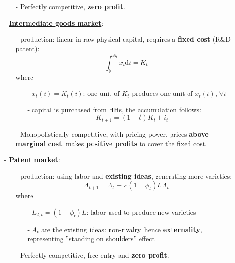 \documentclass[10pt,landscape,a4paper]{article}
\begin{document}
\begin{multicols*}{3}
\begin{itemize}
\begin{itemize}
        \item[-] Perfectly competitive, \textbf{zero profit}.
    \end{itemize}
    
    \item[-] \underline{\textbf{Intermediate goods market}}: 
    \begin{itemize}
        \item[-] production: linear in raw physical capital, requires a \textbf{fixed cost} (R\&D patent):
        $$
        \int^{A_t}_0 x_t \mathrm{d}i = K_t
        $$
        where
        \begin{itemize}
            \item[-] $x_t(i)=K_t(i)$: one unit of $K_t$ produces one unit of $x_t(i)$, \underline{$\forall i$}
            \item[-] capital is purchased from HHs, the accumulation follows: 
            $$K_{t+1}=(1-\delta)K_t+i_t$$
            
        \end{itemize}
        
        \item[-] Monopolistically competitive, with pricing power, prices \textbf{above marginal cost}, makes \textbf{positive profits} to cover the fixed cost.
    \end{itemize}
    
    \item[-] \underline{\textbf{Patent market}}:
    \begin{itemize}
        \item[-] production: using labor and \textbf{existing ideas}, generating more varieties:
        $$
        A_{t+1}-A_t = \kappa (1-\phi_t)L A_t
        $$
        where
        \begin{itemize}
            \item[-] $L_{2,t}=(1-\phi_t)L$: labor used to produce new varieties
            \item[-] $A_t$ are the existing ideas: non-rivalry, hence \textbf{externality}, representing ''standing on shoulders'' effect
            
        \end{itemize}
        
        \item[-] Perfectly competitive, free entry and \textbf{zero profit}.
    \end{itemize}
    
\end{itemize}


\end{multicols*}
\end{document}
